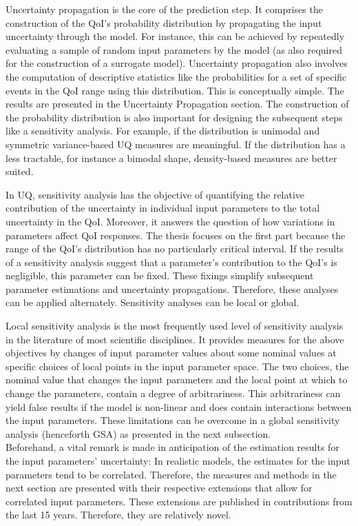 Uncertainty propagation is the core of the prediction step. It comprises the construction of the QoI's probability distribution by propagating the input uncertainty through the model. For instance, this can be achieved by repeatedly evaluating a sample of random input parameters by the model (as also required for the construction of a surrogate model). Uncertainty propagation also involves the computation of descriptive statistics like the probabilities for a set of specific events in the QoI range using this distribution. This is conceptually simple. The results are presented in the Uncertainty Propagation section. The construction of the probability distribution is also important for designing the subsequent steps like a sensitivity analysis. For example, if the distribution is unimodal and symmetric variance-based UQ measures are meaningful. If the distribution has a less tractable, for instance a bimodal shape, density-based measures are better suited.

In UQ, sensitivity analysis has the objective of quantifying the relative contribution of the uncertainty in individual input parameters to the total uncertainty in the QoI. Moreover, it answers the question of how variations in parameters affect QoI responses. The thesis focuses on the first part because the range of the QoI's distribution has no particularly critical interval. If the results of a sensitivity analysis suggest that a parameter's contribution to the QoI's is negligible, this parameter can be fixed. These fixings simplify subsequent parameter estimations and uncertainty propagations. Therefore, these analyses can be applied alternately. Sensitivity analyses can be local or global.

Local sensitivity analysis is the most frequently used level of sensitivity analysis in the literature of most scientific disciplines. It provides measures for the above objectives by changes of input parameter values about some nominal values at specific choices of local points in the input parameter space. The two choices, the nominal value that changes the input parameters and the local point at which to change the parameters, contain a degree of arbitrariness. This arbitrariness can yield false results if the model is non-linear and does contain interactions between the input parameters. These limitations can be overcome in a global sensitivity analysis (henceforth GSA) as presented in the next subsection.\\
\newline
Beforehand, a vital remark is made in anticipation of the estimation results for the input parameters' uncertainty: In realistic models, the estimates for the input parameters tend to be correlated. Therefore, the measures and methods in the next section are presented with their respective extensions that allow for correlated input parameters. These extensions are published in contributions from the last 15 years. Therefore, they are relatively novel.

